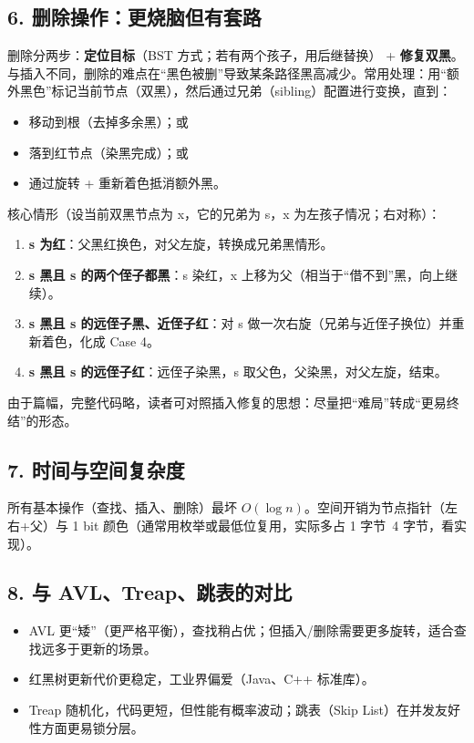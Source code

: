 \documentclass[lang=cn,newtx,10pt,scheme=chinese]{../elegantbook}
\begin{document}
\subsection{6. 删除操作：更烧脑但有套路}
删除分两步：\textbf{定位目标}（BST 方式；若有两个孩子，用后继替换） + \textbf{修复双黑}。与插入不同，删除的难点在“黑色被删”导致某条路径黑高减少。常用处理：用“额外黑色”标记当前节点（双黑），然后通过兄弟（sibling）配置进行变换，直到：
\begin{itemize}
  \item 移动到根（去掉多余黑）；或
  \item 落到红节点（染黑完成）；或
  \item 通过旋转 + 重新着色抵消额外黑。
\end{itemize}
核心情形（设当前双黑节点为 x，它的兄弟为 s，x 为左孩子情况；右对称）：
\begin{enumerate}
  \item \textbf{s 为红}：父黑红换色，对父左旋，转换成兄弟黑情形。
  \item \textbf{s 黑且 s 的两个侄子都黑}：s 染红，x 上移为父（相当于“借不到”黑，向上继续）。
  \item \textbf{s 黑且 s 的远侄子黑、近侄子红}：对 s 做一次右旋（兄弟与近侄子换位）并重新着色，化成 Case 4。
  \item \textbf{s 黑且 s 的远侄子红}：远侄子染黑，s 取父色，父染黑，对父左旋，结束。
\end{enumerate}


由于篇幅，完整代码略，读者可对照插入修复的思想：尽量把“难局”转成“更易终结”的形态。

\subsection{7. 时间与空间复杂度}
所有基本操作（查找、插入、删除）最坏 \(O(\log n)\)。空间开销为节点指针（左右+父）与 1 bit 颜色（通常用枚举或最低位复用，实际多占 1 字节~4 字节，看实现）。

\subsection{8. 与 AVL、Treap、跳表的对比}
\begin{itemize}
  \item AVL 更“矮”（更严格平衡），查找稍占优；但插入/删除需要更多旋转，适合查找远多于更新的场景。
  \item 红黑树更新代价更稳定，工业界偏爱（Java、C++ 标准库）。
  \item Treap 随机化，代码更短，但性能有概率波动；跳表（Skip List）在并发友好性方面更易锁分层。
\end{itemize}
\end{document}
